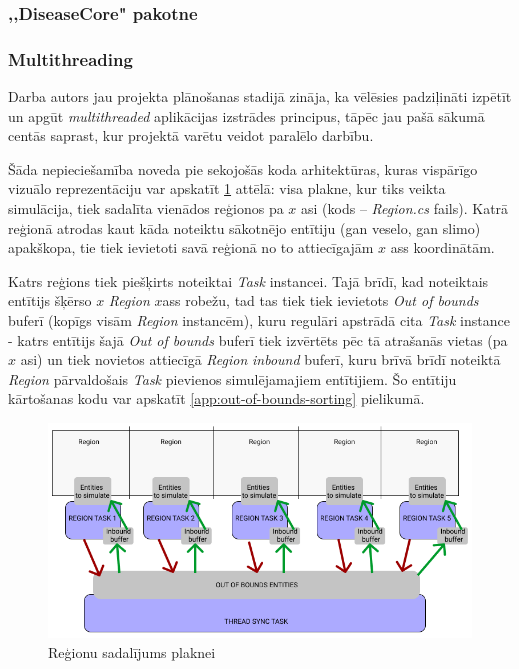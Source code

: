 \subsubsection{,,DiseaseCore" pakotne}
\subsubsection*{Multithreading}
Darba autors jau projekta plānošanas stadijā zināja, ka vēlēsies padziļināti
izpētīt un apgūt \emph{multithreaded} aplikācijas izstrādes principus, tāpēc jau pašā sākumā
centās saprast, kur projektā varētu veidot paralēlo darbību.

Šāda nepieciešamība noveda pie sekojošās koda arhitektūras, kuras vispārīgo
vizuālo reprezentāciju var apskatīt \ref{img:multithreaded-layout} attēlā: visa plakne, kur tiks
veikta simulācija, tiek sadalīta vienādos reģionos pa \(x\) asi (kods -- \emph{Region.cs} fails).
Katrā reģionā atrodas kaut kāda noteiktu sākotnējo entītiju (gan veselo, gan slimo) apakškopa,
tie tiek ievietoti savā reģionā no to attiecīgajām \(x\) ass koordinātām.

Katrs reģions tiek piešķirts noteiktai \emph{Task}\cite{csharp:task} instancei.
Tajā brīdī, kad noteiktais entītijs šķērso \(x\) \emph{Region} \(x\)ass robežu, tad tas tiek tiek
ievietots \emph{Out of bounds} buferī (kopīgs visām \emph{Region} instancēm), kuru
regulāri apstrādā cita \emph{Task} instance - katrs entītijs šajā \emph{Out of bounds} buferī tiek
izvērtēts pēc tā atrašanās vietas (pa \(x\) asi) un tiek novietos attiecīgā \emph{Region}
\emph{inbound} buferī, kuru brīvā brīdī noteiktā \emph{Region} pārvaldošais \emph{Task} pievienos
simulējamajiem entītijiem. Šo entītiju kārtošanas kodu var apskatīt
\ref{app:out-of-bounds-sorting} pielikumā.


\begin{figure}[H]
	\centering
	\includegraphics[scale=0.5]{images/multithreaded-layout.png}
	\caption{Reģionu sadalījums plaknei}
	\label{img:multithreaded-layout}
\end{figure}

